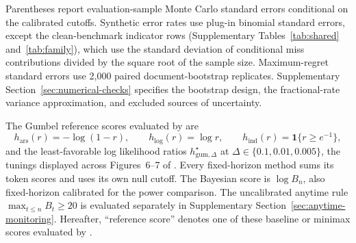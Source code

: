 \documentclass[11pt]{article}
\newcommand{\ind}{\mathbf 1}
\begin{document}
Parentheses report evaluation-sample Monte Carlo standard errors conditional on the calibrated cutoffs.  Synthetic error rates use plug-in binomial standard errors, except the clean-benchmark indicator rows (Supplementary Tables~\ref{tab:shared} and~\ref{tab:family}), which use the standard deviation of conditional miss contributions divided by the square root of the sample size.  Maximum-regret standard errors use 2,000 paired document-bootstrap replicates.  Supplementary Section~\ref{sec:numerical-checks} specifies the bootstrap design, the fractional-rate variance approximation, and excluded sources of uncertainty.

The Gumbel reference scores evaluated by \citet{li2025framework} are
\begin{equation}
  h_{\mathrm{ars}}(r)=-\log(1-r),\qquad
  h_{\log}(r)=\log r,\qquad
  h_{\mathrm{ind}}(r)=\ind\{r\ge e^{-1}\},
\end{equation}
and the least-favorable log likelihood ratios $h_{\mathrm{gum},\Delta}^\star$ at $\Delta\in\{0.1,0.01,0.005\}$, the tunings displayed across Figures~6--7 of \citet{li2025framework}.  Every fixed-horizon method sums its token scores and uses its own null cutoff.  The Bayesian score is $\log B_n$, also fixed-horizon calibrated for the power comparison.  The uncalibrated anytime rule $\max_{t\le n}B_t\ge20$ is evaluated separately in Supplementary Section~\ref{sec:anytime-monitoring}.  Hereafter, ``reference score'' denotes one of these baseline or minimax scores evaluated by \citet{li2025framework}.
\end{document}
